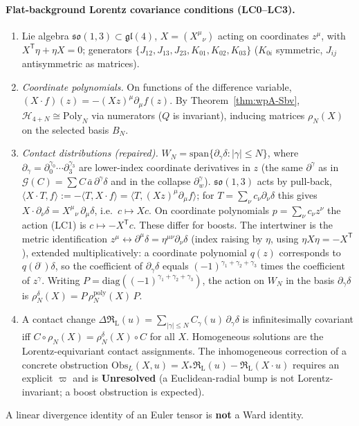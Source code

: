 \documentclass{article}
\theoremstyle{remark}
\newcommand{\RL}{\mathfrak R_{\mathrm L}}
\begin{document}
\paragraph{Flat-background Lorentz covariance conditions (LC0--LC3).}
\begin{enumerate}
\item[(LC0)] Lie algebra $\mathfrak{so}(1,3)\subset\mathfrak{gl}(4)$, $X=(X^\mu{}_\nu)$ acting on coordinates $z^\mu$, with $X^{\mathsf T}\eta+\eta X=0$; generators $\{J_{12},J_{13},J_{23},K_{01},K_{02},K_{03}\}$ ($K_{0i}$ symmetric, $J_{ij}$ antisymmetric as matrices).
\item[(LC1)] \emph{Coordinate polynomials.} On functions of the difference variable, $(X\cdot f)(z)=-(Xz)^\mu\partial_\mu f(z)$.
By Theorem~\ref{thm:wpA-Sbv}, $\mathcal H_{4+N}\cong\mathrm{Poly}_N$ via numerators ($Q$ is invariant), inducing matrices $\rho_N(X)$ on the selected basis $B_N$.
\item[(LC2)] \emph{Contact distributions (repaired).} $W_N=\mathrm{span}\{\partial_\gamma\delta:|\gamma|\le N\}$, where $\partial_\gamma=\partial_0^{\gamma_0}\cdots\partial_3^{\gamma_3}$ are lower-index coordinate derivatives in $z$ (the same $\partial^\gamma$ as in $\mathcal G(C)=\sum C\,\bar a\,\partial^\gamma\delta$ and in the collapse $\partial_w^\gamma$).
$\mathfrak{so}(1,3)$ acts by pull-back, $\langle X\cdot T,f\rangle:=-\langle T,X\cdot f\rangle=\langle T,(Xz)^\mu\partial_\mu f\rangle$; for $T=\sum_\nu c_\nu\partial_\nu\delta$ this gives $X\cdot\partial_\nu\delta=X^\mu{}_\nu\,\partial_\mu\delta$, i.e.\ $c\mapsto Xc$.
On coordinate polynomials $p=\sum_\nu c_\nu z^\nu$ the action (LC1) is $c\mapsto-X^{\mathsf T}c$.
These differ for boosts.
The intertwiner is the metric identification $z^\mu\leftrightarrow\partial^\mu\delta=\eta^{\mu\nu}\partial_\nu\delta$ (index raising by $\eta$, using $\eta X\eta=-X^{\mathsf T}$), extended multiplicatively: a coordinate polynomial $q(z)$ corresponds to $q(\partial^\cdot)\delta$, so the coefficient of $\partial_\gamma\delta$ equals $(-1)^{\gamma_1+\gamma_2+\gamma_3}$ times the coefficient of $z^\gamma$.
Writing $P=\mathrm{diag}((-1)^{\gamma_1+\gamma_2+\gamma_3})$, the action on $W_N$ in the basis $\partial_\gamma\delta$ is $\rho^\delta_N(X)=P\,\rho^{\mathrm{poly}}_N(X)\,P$.
\item[(LC3)] A contact change $\Delta\RL(u)=\sum_{|\gamma|\le N}C_\gamma(u)\,\partial_\gamma\delta$ is infinitesimally covariant iff $C\circ\rho_N(X)=\rho^\delta_N(X)\circ C$ for all $X$.
Homogeneous solutions are the Lorentz-equivariant contact assignments.
The inhomogeneous correction of a concrete obstruction $\mathrm{Obs}_L(X,u)=X_*\RL(u)-\RL(X\cdot u)$ requires an explicit $\varpi$ and is \textbf{Unresolved} (a Euclidean-radial bump is not Lorentz-invariant; a boost obstruction is expected).
\end{enumerate}
A linear divergence identity of an Euler tensor is \textbf{not} a Ward identity.
\end{document}
